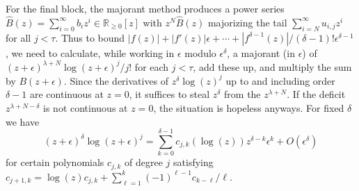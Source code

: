 \documentclass[10pt]{article}
\numberwithin{equation}{section}
\begin{document}
For the final block, the majorant method produces a power series $\hat{B}(z) = \sum_{i=0}^{\infty} b_i z^i \in \mathbb{R}_{\ge 0}[z]$ with $z^N \hat{B}(z)$ majorizing the tail $\sum_{i = N}^{\infty} u_{i,j} z^i$ for all $j<\tau$. Thus to bound $|f(z)| + |f'(z)| \epsilon + \cdots + |f^{\delta-1}(z)|/(\delta-1)! \epsilon^{\delta-1}$, we need to calculate, while working in $\epsilon$ modulo $\epsilon^{\delta}$, a majorant (in $\epsilon$) of $(z+\epsilon)^{\lambda+N} \log(z+\epsilon)^j/j!$ for each $j<\tau$, add these up, and multiply the sum by $B(z+\epsilon)$. Since the derivatives of $z^\delta \log(z)^{j}$ up to and including order $\delta-1$ are continuous at $z=0$, it suffices to steal $z^\delta$ from the $z^{\lambda+N}$. If the deficit $z^{\lambda+N-\delta}$ is not continuous at $z=0$, the situation is hopeless anyways.
For fixed $\delta$ we have
\begin{equation*}
(z+\epsilon)^\delta \log(z+\epsilon)^{j} = \sum_{k=0}^{\delta-1} c_{j,k}(\log(z)) z^{\delta-k} \epsilon^{k} + O(\epsilon^\delta)
\end{equation*}
for certain polynomials $c_{j,k}$ of degree $j$ satisfying $c_{j+1,k} = \log(z) c_{j,k} + \sum_{\ell=1}^{k} (-1)^{\ell-1}c_{k-\ell}/\ell$.
\end{document}
